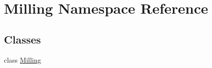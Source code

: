 \hypertarget{namespace_milling}{}\section{Milling Namespace Reference}
\label{namespace_milling}
\subsection*{Classes}
\begin{DoxyCompactItemize}
\item 
class \hyperlink{class_milling_1_1_milling}{Milling}
\end{DoxyCompactItemize}

